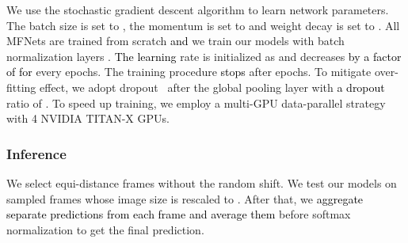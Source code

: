 \documentclass[runningheads]{llncs}
\newcommand{\nj}[1]{\textcolor{black}{#1}}
\begin{document}
We use the stochastic gradient descent algorithm to learn network parameters. The batch size is set to , the momentum is set to  and weight decay is set to . All MFNets are trained from scratch \nj{and} we train our models with batch normalization layers \cite{ioffe2015batch}. \nj{The learning} rate is initialized as  and decreases \nj{by a factor of  for} every  epochs. The training procedure \nj{stops} after  epochs. To mitigate over-fitting effect, we adopt dropout~\cite{srivastava2014dropout} after the global pooling layer with \nj{a dropout} ratio of . To speed up training, we employ a multi-GPU data-parallel strategy with 4 NVIDIA TITAN-X GPUs.

\subsubsection{Inference}
We select equi-distance  frames without the random shift. We test our models on sampled frames whose image size is rescaled to . After that, we \nj{aggregate separate predictions from each frame and average them} before softmax normalization to get the final prediction.  
\end{document}
